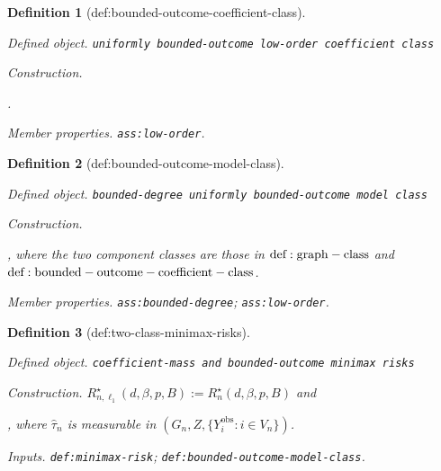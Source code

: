 \documentclass{article}
\newtheorem{definition}{Definition}
\begin{document}
\begin{definition}[def:bounded-outcome-coefficient-class]\label{def:bounded-outcome-coefficient-class}
\par\smallskip\noindent\emph{Defined object.} \texttt{uniformly bounded-\allowbreak{}outcome low-\allowbreak{}order coefficient class}
\par\smallskip\noindent\emph{Construction.} \par\noindent {}\par\noindent.
\par\smallskip\noindent\emph{Member properties.} \texttt{ass:\allowbreak{}low-\allowbreak{}order}.
\end{definition}

\begin{definition}[def:bounded-outcome-model-class]\label{def:bounded-outcome-model-class}
\par\smallskip\noindent\emph{Defined object.} \texttt{bounded-\allowbreak{}degree uniformly bounded-\allowbreak{}outcome model class}
\par\smallskip\noindent\emph{Construction.} \par\noindent {}\par\noindent, where the two component classes are those in \({\rm def:graph-class}\) and \({\rm def:bounded-outcome-coefficient-class}\).
\par\smallskip\noindent\emph{Member properties.} \texttt{ass:\allowbreak{}bounded-\allowbreak{}degree}; \texttt{ass:\allowbreak{}low-\allowbreak{}order}.
\end{definition}

\begin{definition}[def:two-class-minimax-risks]\label{def:two-class-minimax-risks}
\par\smallskip\noindent\emph{Defined object.} \texttt{coefficient-\allowbreak{}mass and bounded-\allowbreak{}outcome minimax risks}
\par\smallskip\noindent\emph{Construction.} \(R_{n,\ell_1}^{\star}(d,\beta,p,B):=R_n^\star(d,\beta,p,B)\) and \par\noindent {}\par\noindent, where \(\widehat\tau_n\) is measurable in \((G_n,Z,\{Y_i^{\mathrm{obs}}:i\in V_n\})\).
\par\smallskip\noindent\emph{Inputs.} \texttt{def:\allowbreak{}minimax-\allowbreak{}risk}; \texttt{def:\allowbreak{}bounded-\allowbreak{}outcome-\allowbreak{}model-\allowbreak{}class}.
\end{definition}
\end{document}
